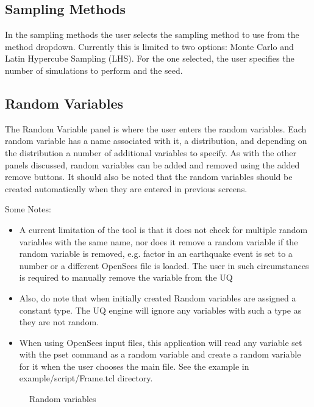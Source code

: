 \subsection{Sampling Methods}
In the sampling methods the user selects the sampling method to use from the method dropdown. Currently this is limited to two options: 
Monte Carlo and Latin Hypercube Sampling (LHS). For the one selected, the user specifies the number of simulations to perform and the seed.

\subsection{Random Variables}
The Random Variable panel is where the user enters the random variables. Each random variable has a name associated with it, a distribution, 
and depending on the distribution a number of additional variables to specify. As with the other panels discussed, random variables can be 
added and removed using the added remove buttons. It should also be noted that the random variables should be created automatically 
when they are entered in previous screens. 


Some Notes:
\begin{itemize}
\item A current limitation of the tool is that it does not check for multiple random variables with the same name, nor does it remove a 
random variable if the random variable is removed, e.g. factor in an earthquake event is set to a number or a different OpenSees file is loaded. 
The user in such circumstances is required to manually remove the variable from the UQ
\item Also, do note that when initially created Random variables are assigned a constant type. 
The UQ engine will ignore any variables with such a type as they are not random.
\item When using OpenSees input files, this application will read any variable set with the pset command as a random variable and create a 
random variable for it when the user chooses the main file. See the example in example/script/Frame.tcl directory.
\end{itemize}


\begin{figure}[!htbp]
  \caption{Random variables}
  \label{fig:figure11}
\end{figure}



